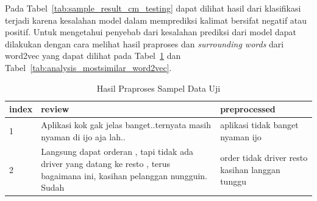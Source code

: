 Pada Tabel~\ref{tab:sample_result_cm_testing} dapat dilihat hasil dari klasifikasi terjadi karena kesalahan
model dalam memprediksi kalimat bersifat negatif atau positif. Untuk mengetahui penyebab dari kesalahan prediksi
dari model dapat dilakukan dengan cara melihat hasil praproses dan \emph{surrounding words} dari word2vec yang dapat dilihat
pada Tabel~\ref{tab:analysis_preprocess_predicted_test} dan Tabel~\ref{tab:analysis_mostsimilar_word2vec}.

\begin{table}[H]
  \centering
  \caption{Hasil Praproses Sampel Data Uji}
  \label{tab:analysis_preprocess_predicted_test}
  \begin{tabularx}{\columnwidth}{|l|X|X|}
    \hline
    index & review                                                                                                                       & preprocessed                                    \\ \hline
    1     & Aplikasi kok gak jelas banget..ternyata masih nyaman di ijo aja lah..                                                        & aplikasi tidak banget nyaman ijo                \\ \hline
    2     & Langsung dapat orderan , tapi tidak ada driver yang datang ke resto , terus bagaimana ini, kasihan pelanggan nungguin. Sudah & order tidak driver resto kasihan langgan tunggu \\ \hline
  \end{tabularx}
\end{table}

